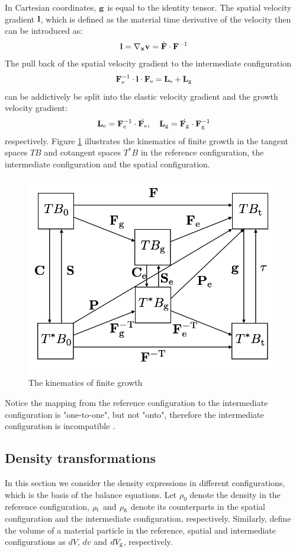 In Cartesian coordinates, $\bold{g}$ is equal to the identity tensor. The spatial velocity gradient $\bold{l}$, which is defined as the material time derivative of the velocity then can be introduced as:
\begin{equation}
\bold{l} = \nabla_{\bold{x}} \bold{v} = \dot{\bold{F}} \cdot \bold{F}^{-1}
\end{equation}
The pull back of the spatial velocity gradient to the intermediate configuration
\begin{equation}
\bold{F}_{\mathrm{e}}^{-1} \cdot \bold{l} \cdot \bold{F}_{\mathrm{e}} = \bold{L}_{\mathrm{e}} + \bold{L}_{\mathrm{g}}
\end{equation} 
can be addictively be split into the elastic velocity gradient and the growth velocity gradient:
\begin{equation} \label{eq:L}
\bold{L}_\mathrm{e} = \bold{F}_\mathrm{e}^{-1} \cdot \dot{\bold{F}_\mathrm{e}}, \quad \bold{L}_\mathrm{g} = \dot{\bold{F}_\mathrm{g}} \cdot \bold{F}_\mathrm{g}^{-1} 
\end{equation}
respectively. Figure \ref{fig:configurations} illustrates the kinematics of finite growth in the tangent spaces $TB$ and cotangent spaces $T^*B$ in the reference configuration, the intermediate configuration and the spatial configuration.

\begin{figure}[H]
   \centering
   \includegraphics[width=.5\textwidth]{./figures/configurations.png} %
   \caption{The kinematics of finite growth}
   \label{fig:configurations}
\end{figure}

Notice the mapping from the reference configuration to the intermediate configuration is "one-to-one", but not "onto", therefore the intermediate configuration is incompatible \cite{Cowin}.

\subsection{Density transformations}
In this section we consider the density expressions in different configurations, which is the basis of the balance equations. Let $\rho_0$ denote the density in the reference configuration, $\rho_{\mathrm{t}}$ and $\rho_{\mathrm{g}}$ denote its counterparts in the spatial configuration and the intermediate configuration, respectively. Similarly, define the volume of a material particle in the reference,  spatial and intermediate configurations as $dV$, $dv$ and $dV_{\mathrm{g}}$, respectively.

